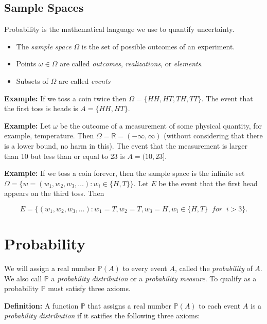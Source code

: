 \documentclass[
]{book}
\providecommand{\tightlist}{%
  \setlength{\itemsep}{0pt}\setlength{\parskip}{0pt}}
\theoremstyle{definition}
\theoremstyle{definition}
\theoremstyle{definition}
\theoremstyle{definition}
\theoremstyle{remark}
\begin{document}
\hypertarget{sample-spaces}{%
\subsection{Sample Spaces}\label{sample-spaces}}

Probability is the mathematical language we use to quantify uncertainty.

\begin{itemize}
\tightlist
\item
  The \emph{sample space} \(\Omega\) is the set of possible outcomes of an experiment.
\item
  Points \(\omega\in\Omega\) are called \emph{outcomes}, \emph{realizations}, or \emph{elements}.
\item
  Subsets of \(\Omega\) are called \emph{events}
\end{itemize}

\textbf{Example:} If we toss a coin twice then \(\Omega =\{ HH, HT, TH, TT\}\). The event that the first toss is heads is \(A=\{HH,HT\}\).

\textbf{Example:} Let \(\omega\) be the outcome of a measurement of some physical quantity, for example, temperature. Then \(\Omega=\mathbb{R}=(-\infty,\infty)\) (without considering that there is a lower bound, no harm in this). The event that the measurement is larger than 10 but less than or equal to 23 is \(A=(10,23]\).

\textbf{Example:} If we toss a coin forever, then the sample space is the infinite set \(\Omega = \{w=(w_1,w_2,w_3,\dots): w_i\in\{H,T\}\}\). Let \(E\) be the event that the first head appears on the third toss. Then

\[
E=\{(w_1,w_2,w_3,\dots):w_1=T,w_2=T,w_3=H,w_i\in\{H,T\}\;\; for\;\; i>3\}.
\]

\hypertarget{probability}{%
\section{Probability}\label{probability}}

We will assign a real number \(\mathbb{P}(A)\) to every event \(A\), called the \emph{probability} of \(A\). We also call \(\mathbb{P}\) a \emph{probability distribution} or a \emph{probability measure}. To qualify as a probability \(\mathbb{P}\) must satisfy three axioms.

\textbf{Definition:} A function \(\mathbb{P}\) that assigns a real number \(\mathbb{P}(A)\) to each event \(A\) is a \emph{probability distribution} if it satifies the following three axioms:
\end{document}
